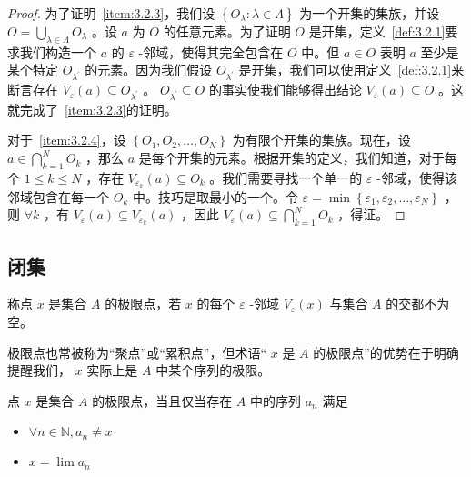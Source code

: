 \begin{proof}
  为了证明~\ref{item:3.2.3}，我们设 \(\left\{  {{O}_{\lambda } : \lambda  \in  \Lambda }\right\}\) 为一个开集的集族，并设 \(O = \mathop{\bigcup }\limits_{{\lambda  \in  \Lambda }}{O}_{\lambda }\) 。设 \(a\) 为 \(O\) 的任意元素。为了证明 \(O\) 是开集，定义~\ref{def:3.2.1}要求我们构造一个 \(a\) 的 \(\varepsilon\) -邻域，使得其完全包含在 \(O\) 中。但 \(a \in  O\) 表明 \(a\) 至少是某个特定 \({O}_{{\lambda }^{\prime }}\) 的元素。因为我们假设 \({O}_{{\lambda }^{\prime }}\) 是开集，我们可以使用定义~\ref{def:3.2.1}来断言存在 \({V}_{\varepsilon }\left( a\right)  \subseteq  {O}_{{\lambda }^{\prime }}\) 。 \({O}_{{\lambda }^{\prime }} \subseteq  O\) 的事实使我们能够得出结论 \({V}_{\varepsilon }\left( a\right)  \subseteq  O\) 。这就完成了~\ref{item:3.2.3}的证明。

对于~\ref{item:3.2.4}，设 \(\left\{  {{O}_{1},{O}_{2},\ldots ,{O}_{N}}\right\}\) 为有限个开集的集族。现在，设 \(a \in  \mathop{\bigcap }\limits_{{k = 1}}^{N}{O}_{k}\) ，那么 \(a\) 是每个开集的元素。根据开集的定义，我们知道，对于每个 \(1 \leq  k \leq  N\) ，存在 \({V}_{{\varepsilon }_{k}}\left( a\right)  \subseteq  {O}_{k}\) 。我们需要寻找一个单一的 \(\varepsilon\) -邻域，使得该邻域包含在每一个 \({O}_{k}\) 中。技巧是取最小的一个。令 \(\varepsilon  = \min \left\{  {{\varepsilon }_{1},{\varepsilon }_{2},\ldots ,{\varepsilon }_{N}}\right\}\) ，则 \(\forall k\) ，有 \({V}_{\varepsilon }\left( a\right)  \subseteq  {V}_{{\varepsilon }_{k}}\left( a\right)\) ，因此 \({V}_{\varepsilon }\left( a\right)  \subseteq  \mathop{\bigcap }\limits_{{k = 1}}^{N}{O}_{k}\) ，得证。
\end{proof}

\subsection{闭集}
\begin{Def}
  \label{def:3.2.4}
  称点 \(x\) 是集合 \(A\) 的极限点，若 \(x\) 的每个 \(\varepsilon\) -邻域 \({V}_{\varepsilon }\left( x\right)\) 与集合 \(A\) 的交都不为空。
\end{Def}


极限点也常被称为“聚点”或“累积点”，但术语“ \(x\) 是 \(A\) 的极限点”的优势在于明确提醒我们， \(x\) 实际上是 \(A\) 中某个序列的极限。

\begin{Thm}
  \label{thm:3.2.5}
  点 \(x\) 是集合 \(A\) 的极限点，当且仅当存在 $A$ 中的序列 $a_n$ 满足
  \begin{itemize}
  \item $\forall n\in \mathbb{N}, a_n\ne x$
  \item $x = \lim\limits_{}a_n$
  \end{itemize}
\end{Thm}

